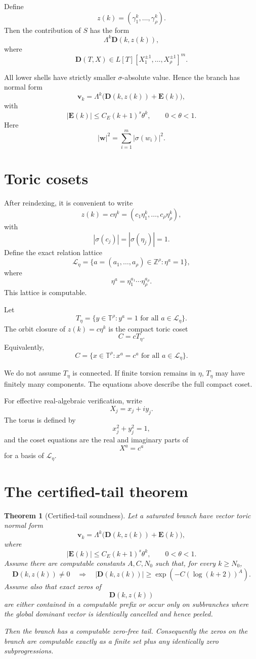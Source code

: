\documentclass[11pt]{article}
\newtheorem{theorem}{Theorem}[section]
\newcommand{\T}{\mathbb T}
\newcommand{\Z}{\mathbb Z}
\begin{document}
Define
\[
z(k)=(\gamma_1^k,\ldots,\gamma_\rho^k).
\]
Then the contribution of \(S\) has the form
\[
\Lambda^k\mathbf D(k,z(k)),
\]
where
\[
\mathbf D(T,X)\in L[T][X_1^{\pm1},\ldots,X_\rho^{\pm1}]^m.
\]

All lower shells have strictly smaller \(\sigma\)-absolute value. Hence the branch has normal form
\[
\mathbf v_k=\Lambda^k\bigl(\mathbf D(k,z(k))+\mathbf E(k)\bigr),
\]
with
\[
|\mathbf E(k)|\le C_E(k+1)^s\theta^k,
\qquad
0<\theta<1.
\]
Here
\[
|\mathbf w|^2=\sum_{i=1}^m|\sigma(w_i)|^2.
\]

\section{Toric cosets}

After reindexing, it is convenient to write
\[
z(k)=c\eta^k=(c_1\eta_1^k,\ldots,c_\rho\eta_\rho^k),
\]
with
\[
|\sigma(c_j)|=|\sigma(\eta_j)|=1.
\]
Define the exact relation lattice
\[
\mathcal L_\eta
=
\{a=(a_1,\ldots,a_\rho)\in\Z^\rho:\eta^a=1\},
\]
where
\[
\eta^a=\eta_1^{a_1}\cdots\eta_\rho^{a_\rho}.
\]
This lattice is computable.

Let
\[
T_\eta=\{y\in\T^\rho:y^a=1\text{ for all }a\in\mathcal L_\eta\}.
\]
The orbit closure of \(z(k)=c\eta^k\) is the compact toric coset
\[
C=cT_\eta.
\]
Equivalently,
\[
C=\{x\in\T^\rho:x^a=c^a\text{ for all }a\in\mathcal L_\eta\}.
\]

We do not assume \(T_\eta\) is connected. If finite torsion remains in \(\eta\), \(T_\eta\) may have finitely many components. The equations above describe the full compact coset.

For effective real-algebraic verification, write
\[
X_j=x_j+iy_j.
\]
The torus is defined by
\[
x_j^2+y_j^2=1,
\]
and the coset equations are the real and imaginary parts of
\[
X^a=c^a
\]
for a basis of \(\mathcal L_\eta\).

\section{The certified-tail theorem}

\begin{theorem}[Certified-tail soundness]
Let a saturated branch have vector toric normal form
\[
\mathbf v_k=\Lambda^k\bigl(\mathbf D(k,z(k))+\mathbf E(k)\bigr),
\]
where
\[
|\mathbf E(k)|\le C_E(k+1)^s\theta^k,
\qquad
0<\theta<1.
\]
Assume there are computable constants \(A,C,N_0\) such that, for every \(k\ge N_0\),
\[
\mathbf D(k,z(k))\ne0
\quad\Longrightarrow\quad
|\mathbf D(k,z(k))|
\ge
\exp(-C(\log(k+2))^A).
\]
Assume also that exact zeros of
\[
\mathbf D(k,z(k))
\]
are either contained in a computable prefix or occur only on subbranches where the global dominant vector is identically cancelled and hence peeled.

Then the branch has a computable zero-free tail. Consequently the zeros on the branch are computable exactly as a finite set plus any identically zero subprogressions.
\end{theorem}
\end{document}

